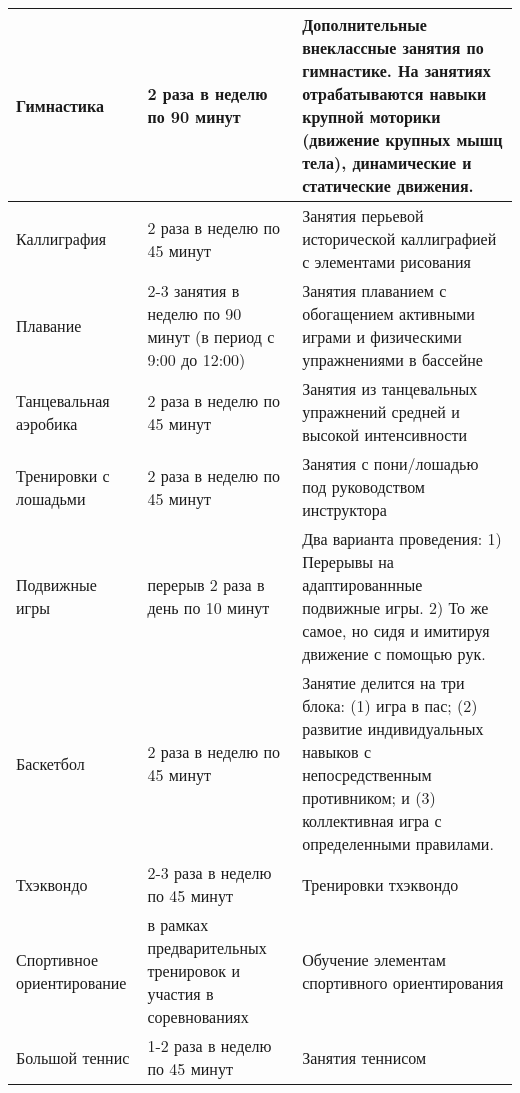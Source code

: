 \begin{center}
\begin{longtable}{|p{}|p{}|p{}|}
    Гимнастика & 2 раза в неделю по 90 минут & Дополнительные внеклассные занятия по гимнастике. На занятиях отрабатываются навыки крупной моторики (движение крупных мышц тела), динамические и статические движения. \\ \hline
    Каллиграфия & 2 раза в неделю по 45 минут  & Занятия перьевой исторической каллиграфией с элементами рисования \\ \hline
    Плавание & 2-3 занятия в неделю по 90 минут (в период с 9:00 до 12:00) & Занятия плаванием с обогащением активными играми и физическими упражнениями в бассейне \\ \hline
    Танцевальная аэробика & 2 раза в неделю по 45 минут & Занятия из танцевальных упражнений средней и высокой интенсивности \\ \hline
    Тренировки с лошадьми  & 2 раза в неделю по 45 минут & Занятия с пони/лошадью под руководством инструктора \\ \hline
    Подвижные игры
 & перерыв 2 раза в день по 10 минут
 & Два варианта проведения: 1) Перерывы на адаптированнные подвижные игры. 2) То же самое, но сидя и имитируя движение с помощью рук.  \\ \hline
    Баскетбол & 2 раза в неделю по 45 минут & Занятие делится на три блока: (1) игра в пас; (2) развитие индивидуальных навыков с непосредственным противником; и (3) коллективная игра с определенными правилами.  \\ \hline
    Тхэквондо & 2-3 раза в неделю по 45 минут & Тренировки тхэквондо \\ \hline
    Спортивное ориентирование & в рамках предварительных тренировок и участия в соревнованиях & Обучение элементам спортивного ориентирования \\ \hline
    Большой теннис & 1-2 раза в неделю по 45 минут & Занятия теннисом \\ \hline
\end{longtable}
\end{center}